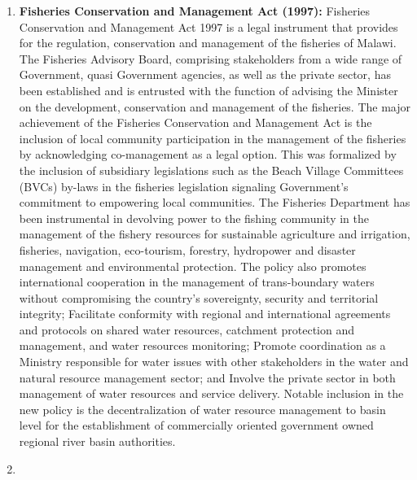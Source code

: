 \documentclass[
]{book}
\begin{document}
\begin{enumerate}
\item
  \textbf{Fisheries Conservation and Management Act (1997):} Fisheries Conservation and Management Act 1997 is a legal instrument that provides for the regulation, conservation and management of the fisheries of Malawi. The Fisheries Advisory Board, comprising stakeholders from a wide range of Government, quasi Government agencies, as well as the private sector, has been established and is entrusted with the function of advising the Minister on the development, conservation and management of the fisheries. The major achievement of the Fisheries Conservation and Management Act is the inclusion of local community participation in the management of the fisheries by acknowledging co-management as a legal option. This was formalized by the inclusion of subsidiary legislations such as the Beach Village Committees (BVCs) by-laws in the fisheries legislation signaling Government's commitment to empowering local communities. The Fisheries Department has been instrumental in devolving power to the fishing community in the management of the fishery resources for sustainable agriculture and irrigation, fisheries, navigation, eco-tourism, forestry, hydropower and disaster management and environmental protection. The policy also promotes international cooperation in the management of trans-boundary waters without compromising the country's sovereignty, security and territorial integrity; Facilitate conformity with regional and international agreements and protocols on shared water resources, catchment protection and management, and water resources monitoring; Promote coordination as a Ministry responsible for water issues with other stakeholders in the water and natural resource management sector; and Involve the private sector in both management of water resources and service delivery. Notable inclusion in the new policy is the decentralization of water resource management to basin level for the establishment of commercially oriented government owned regional river basin authorities.
\item

\end{enumerate}
\end{document}
